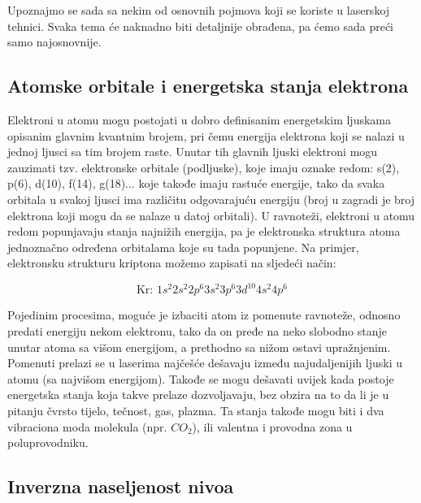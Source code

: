 \documentclass[fleqn]{report}
\begin{document}
Upoznajmo se sada sa nekim od osnovnih pojmova koji se koriste u laserskoj tehnici.
Svaka tema će naknadno biti detaljnije obrađena, pa ćemo sada preći samo najosnovnije.

\subsection{Atomske orbitale i energetska stanja elektrona}

Elektroni u atomu mogu postojati u dobro definisanim energetskim ljuskama opisanim glavnim kvantnim brojem, pri čemu energija elektrona koji se nalazi u jednoj ljusci sa tim brojem raste.
Unutar tih glavnih ljuski elektroni mogu zauzimati tzv. elektronske orbitale (podljuske), koje imaju oznake redom: s(2), p(6), d(10), f(14), g(18)... koje takođe imaju rastuće energije, tako da svaka orbitala u svakoj ljusci ima različitu odgovarajuću energiju (broj u zagradi je broj elektrona koji mogu da se nalaze u datoj orbitali).
U ravnoteži, elektroni u atomu redom popunjavaju stanja najnižih energija, pa je elektronska struktura atoma jednoznačno određena orbitalama koje su tada popunjene. Na primjer, elektronsku strukturu kriptona možemo zapisati na sljedeći način:

\begin{equation*}
    \text{Kr: } 1s^2 2s^2 2p^6 3s^2 3p^6 3d^{10} 4s^2 4p^6
\end{equation*}

Pojedinim procesima, moguće je izbaciti atom iz pomenute ravnoteže, odnosno predati energiju nekom elektronu, tako da on pređe na neko slobodno stanje unutar atoma sa višom energijom, a prethodno sa nižom ostavi upražnjenim.
Pomenuti prelazi se u laserima najčešće dešavaju između najudaljenijih ljuski u atomu (sa najvišom energijom).
Takođe se mogu dešavati uvijek kada postoje energetska stanja koja takve prelaze dozvoljavaju, bez obzira na to da li je u pitanju čvrsto tijelo, tečnost, gas, plazma.
Ta stanja takođe mogu biti i dva vibraciona moda molekula (npr. $CO_2$), ili valentna i provodna zona u poluprovodniku.

\subsection{Inverzna naseljenost nivoa}
\end{document}
